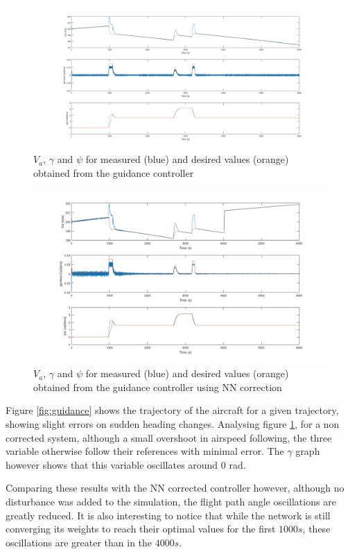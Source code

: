 \begin{figure}[H]
\centering
\includegraphics[width=1.15\textwidth]{Figures/Results/guidance_ref.png}
\caption[Reference following of $V_a$, $\gamma$ and $\psi$ from guidance controller]{$V_a$, $\gamma$ and $\psi$ for measured (blue) and desired values (orange) obtained from the guidance controller}
\label{fig:guidance_ref}
\end{figure}

\begin{figure}[H]
\centering
\includegraphics[width=1.15\textwidth]{Figures/Results/guidance_ref_NN.png}
\caption[Reference following of $V_a$, $\gamma$ and $\psi$ from guidance controller with NN correction]{$V_a$, $\gamma$ and $\psi$ for measured (blue) and desired values (orange) obtained from the guidance controller using NN correction}
\label{fig:guidance_ref_NN}
\end{figure}

Figure \ref{fig:guidance} shows the trajectory of the aircraft for a given trajectory, showing slight errors on sudden heading changes. Analysing figure \ref{fig:guidance_ref}, for a non corrected system, although a small overshoot in airspeed following, the three variable otherwise follow their references with minimal error. The $\gamma$ graph however shows that this variable oscillates around $0$ rad.

Comparing these results with the NN corrected controller however, although no disturbance was added to the simulation, the flight path angle oscillations are greatly reduced. It is also interesting to notice that while the network is still converging its weights to reach their optimal values for the first $1000s$, these oscillations are greater than in the $4000s$.